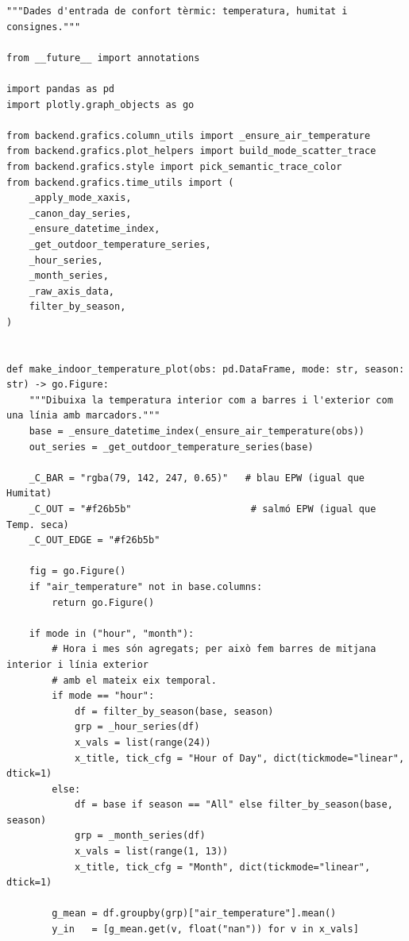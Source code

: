 \documentclass[10pt,a4paper]{article}
\begin{document}
\begin{lstlisting}[style=studioPython,caption={backend/grafics/thermal.py},label={lst:backend-grafics-thermal-py}]
"""Dades d'entrada de confort tèrmic: temperatura, humitat i consignes."""

from __future__ import annotations

import pandas as pd
import plotly.graph_objects as go

from backend.grafics.column_utils import _ensure_air_temperature
from backend.grafics.plot_helpers import build_mode_scatter_trace
from backend.grafics.style import pick_semantic_trace_color
from backend.grafics.time_utils import (
    _apply_mode_xaxis,
    _canon_day_series,
    _ensure_datetime_index,
    _get_outdoor_temperature_series,
    _hour_series,
    _month_series,
    _raw_axis_data,
    filter_by_season,
)


def make_indoor_temperature_plot(obs: pd.DataFrame, mode: str, season: str) -> go.Figure:
    """Dibuixa la temperatura interior com a barres i l'exterior com una línia amb marcadors."""
    base = _ensure_datetime_index(_ensure_air_temperature(obs))
    out_series = _get_outdoor_temperature_series(base)

    _C_BAR = "rgba(79, 142, 247, 0.65)"   # blau EPW (igual que Humitat)
    _C_OUT = "#f26b5b"                     # salmó EPW (igual que Temp. seca)
    _C_OUT_EDGE = "#f26b5b"

    fig = go.Figure()
    if "air_temperature" not in base.columns:
        return go.Figure()

    if mode in ("hour", "month"):
        # Hora i mes són agregats; per això fem barres de mitjana interior i línia exterior
        # amb el mateix eix temporal.
        if mode == "hour":
            df = filter_by_season(base, season)
            grp = _hour_series(df)
            x_vals = list(range(24))
            x_title, tick_cfg = "Hour of Day", dict(tickmode="linear", dtick=1)
        else:
            df = base if season == "All" else filter_by_season(base, season)
            grp = _month_series(df)
            x_vals = list(range(1, 13))
            x_title, tick_cfg = "Month", dict(tickmode="linear", dtick=1)

        g_mean = df.groupby(grp)["air_temperature"].mean()
        y_in   = [g_mean.get(v, float("nan")) for v in x_vals]


\end{lstlisting}
\end{document}
